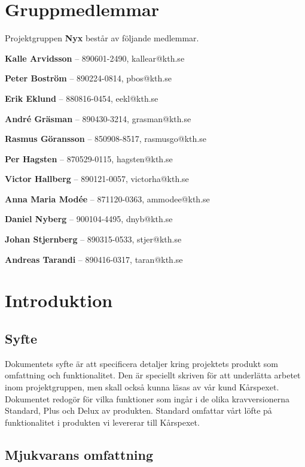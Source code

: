 \documentclass[a4paper, twoside, 11pt, titlepage]{article}
\begin{document}
\clearpage
\section*{Gruppmedlemmar}


Projektgruppen \textbf{Nyx} består av följande medlemmar.

\textbf{Kalle Arvidsson} -- 890601-2490, kallear@kth.se

\textbf{Peter Boström} -- 890224-0814, pbos@kth.se

\textbf{Erik Eklund} -- 880816-0454, eekl@kth.se 

\textbf{André Gräsman} -- 890430-3214, grasman@kth.se 

\textbf{Rasmus Göransson} -- 850908-8517, rasmusgo@kth.se 

\textbf{Per Hagsten} -- 870529-0115, hagsten@kth.se

\textbf{Victor Hallberg} -- 890121-0057, victorha@kth.se

\textbf{Anna Maria Modée} -- 871120-0363, ammodee@kth.se 

\textbf{Daniel Nyberg} -- 900104-4495, dnyb@kth.se 

\textbf{Johan Stjernberg} -- 890315-0533, stjer@kth.se

\textbf{Andreas Tarandi} -- 890416-0317, taran@kth.se

\clearpage \tableofcontents \clearpage

\clearpage
\section{Introduktion}



	\subsection{Syfte}


	Dokumentets syfte är att specificera detaljer kring projektets produkt som omfattning och funktionalitet. Den är speciellt skriven för att underlätta arbetet inom projektgruppen, men skall också kunna läsas av vår kund Kårspexet. Dokumentet redogör för vilka funktioner som ingår i de olika kravversionerna Standard, Plus och Delux av produkten. Standard omfattar vårt löfte på funktionalitet i produkten vi levererar till Kårspexet.

	\subsection{Mjukvarans omfattning}
\end{document}
